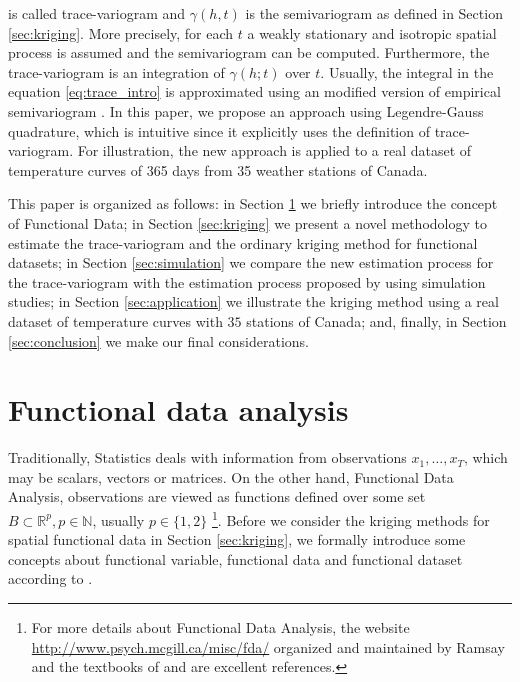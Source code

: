 \documentclass[]{interact}
\theoremstyle{plain}%
\theoremstyle{definition}
\theoremstyle{remark}
\begin{document}
is called trace-variogram and \(\gamma(h, t)\) is the semivariogram as defined in Section \ref{sec:kriging}.
More precisely, for each \(t\) a weakly stationary and isotropic spatial process is assumed and the semivariogram can be computed. Furthermore, the trace-variogram is an
integration of \(\gamma(h;t)\) over \(t\). Usually, the integral in the equation \ref{eq:trace_intro} is approximated using an modified version of empirical semivariogram \citep[see][ for more details]{giraldo2011ordinary}.
In this paper, we propose an approach using Legendre-Gauss quadrature, which is intuitive since it explicitly uses the definition of trace-variogram.
For illustration, the new approach is applied to a real dataset of temperature curves of 365 days from 35 weather stations of Canada.

This paper is organized as follows: in Section \ref{sec:functionalDataAnalysis} we briefly introduce the concept of Functional Data; in Section \ref{sec:kriging} we present a novel methodology to estimate the trace-variogram and the ordinary kriging method for functional datasets; in Section \ref{sec:simulation} we compare the new estimation process for the trace-variogram with the estimation process proposed by \citet{giraldo2011ordinary} using simulation studies;
in Section \ref{sec:application} we illustrate the kriging method using a real dataset of temperature curves with \(35\) stations of Canada; and, finally, in Section \ref{sec:conclusion} we make our final considerations.

\hypertarget{sec:functionalDataAnalysis}{%
\section{Functional data analysis}\label{sec:functionalDataAnalysis}}

Traditionally, Statistics deals with information from observations \(x_1, \dots, x_T\), which may be scalars, vectors or matrices. On the other hand, Functional Data Analysis,
observations are viewed as functions defined over some set \(B \subset \mathbb{R}^p, p \in \mathbb{N}\), usually \(p \in \{1,2\}\) \footnote{For more details about Functional Data Analysis, the website \url{http://www.psych.mcgill.ca/misc/fda/} organized and maintained by Ramsay and the textbooks of \citet{ramsay2006functional} and
  \citet{horvath2012inference} are excellent references.}. Before we consider the kriging methods for spatial functional data in Section \ref{sec:kriging}, we formally introduce some concepts about functional variable, functional data and functional dataset
according to \citet{ferraty2006nonparametric}.
\end{document}
